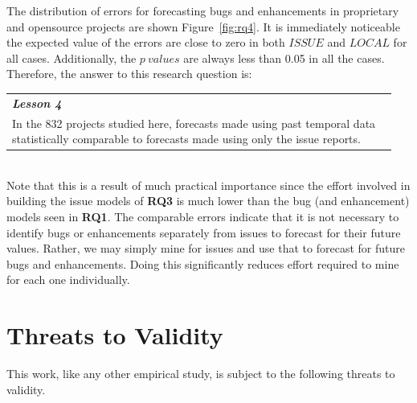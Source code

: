 \documentclass[sigconf, preprint]{acmart}
\newcommand{\fig}[1]{Figure~\ref{fig:#1}}
\begin{document}
The distribution of errors for forecasting bugs and enhancements in proprietary and opensource projects are shown \fig{rq4}. It is immediately noticeable the expected value of the errors are close to zero in both $\mathit{ISSUE}$ and $\mathit{LOCAL}$ for all cases. Additionally, the $p~values$ are always less than 0.05 in all the cases. Therefore, the answer to this research question is:\\[0.1cm]
\noindent\begin{minipage}{\linewidth}
	\begin{center}
		\begin{tabular}{p{0.95\linewidth}}
			\arrayrulecolor{Gray}
			\hline
			\rowcolor{Gray}
			\textbf{\textit{Lesson 4}}\bigstrut\\
			\rowcolor{Gray} In the 832 projects studied here, forecasts made using past 
			temporal data 
		statistically comparable to	forecasts made using only the issue reports.\\\hline
		\end{tabular}
	\end{center}
\end{minipage}\bigstrut[t]\\

Note that this is a result of much practical
importance since the effort involved in building the issue models of {\bf RQ3} is much lower than the bug (and enhancement) models seen in {\bf RQ1}.  The comparable errors indicate that it is not necessary to identify bugs or enhancements separately from issues to forecast for their future values. Rather, we may simply mine for issues and use that to forecast for future bugs and enhancements. Doing this significantly reduces effort required to mine for each one individually. 




\section{Threats to Validity}
\label{sect:threats}
This work, like any other empirical study, is subject to the following threats 
to validity.
    
\end{document}
